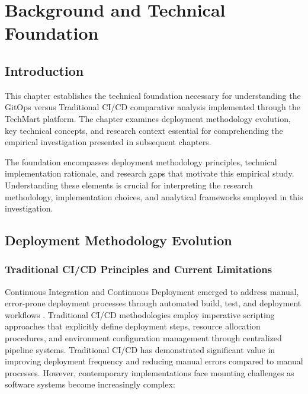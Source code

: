 \chapter{Background and Technical Foundation}

\section{Introduction}

This chapter establishes the technical foundation necessary for understanding the GitOps versus Traditional CI/CD comparative analysis implemented through the TechMart platform. The chapter examines deployment methodology evolution, key technical concepts, and research context essential for comprehending the empirical investigation presented in subsequent chapters.

The foundation encompasses deployment methodology principles, technical implementation rationale, and research gaps that motivate this empirical study. Understanding these elements is crucial for interpreting the research methodology, implementation choices, and analytical frameworks employed in this investigation.

\section{Deployment Methodology Evolution}

\subsection{Traditional CI/CD Principles and Current Limitations}

Continuous Integration and Continuous Deployment emerged to address manual, error-prone deployment processes through automated build, test, and deployment workflows \cite{fowler2013continuous, kim2016devops}. Traditional CI/CD methodologies employ imperative scripting approaches that explicitly define deployment steps, resource allocation procedures, and environment configuration management through centralized pipeline systems.
Traditional CI/CD has demonstrated significant value in improving deployment frequency and reducing manual errors compared to manual processes. However, contemporary implementations face mounting challenges as software systems become increasingly complex:

